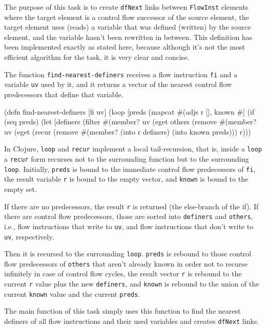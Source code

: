 \documentclass[submission]{eptcs}
\begin{document}
The purpose of this task is to create \verb|dfNext| links between
\verb|FlowInst| elements where the target element is a control flow successor
of the source element, the target element uses (reads) a variable that was
defined (written) by the source element, and the variable hasn't been rewritten
in between.  This definition has been implemented exactly as stated here,
because although it's not the most efficient algorithm for the task, it is very
clear and concise.

The function \verb|find-nearest-definers| receives a flow instruction \verb|fi|
and a variable \verb|uv| used by it, and it returns a vector of the nearest
control flow predecessors that define that variable.

\begin{clojurecode}
(defn find-nearest-definers [fi uv]
  (loop [preds (mapcat #(adjs %
         r [], known #{}]
    (if (seq preds)
      (let [definers (filter #(member? uv (eget %
            others   (remove #(member? uv (eget %
        (recur (remove #(member? %
               (into r definers) (into known preds)))
      r)))
\end{clojurecode}

In Clojure, \verb|loop| and \verb|recur| implement a local tail-recursion, that
is, inside a \verb|loop| a \verb|recur| form recurses not to the surrounding
function but to the surrounding \verb|loop|.  Initially, \verb|preds| is bound
to the immediate control flow predecessors of \verb|fi|, the result variable
\verb|r| is bound to the empty vector, and \verb|known| is bound to the empty
set.

If there are no predecessors, the result \verb|r| is returned (the else-branch
of the if).  If there are control flow predecessors, those are sorted into
\verb|definers| and \verb|others|, i.e., flow instructions that write to
\verb|uv|, and flow instructions that don't write to \verb|uv|, respectively.

Then it is recursed to the surrounding \verb|loop|.  \verb|preds| is rebound to
those control flow predecessors of \verb|others| that aren't already known in
order not to recurse infinitely in case of control flow cycles, the result
vector \verb|r| is rebound to the current \verb|r| value plus the new
\verb|definers|, and \verb|known| is rebound to the union of the current
\verb|known| value and the current \verb|preds|.

The main function of this task simply uses this function to find the nearest
definers of all flow instructions and their used variables and creates
\verb|dfNext| links.
\end{document}
